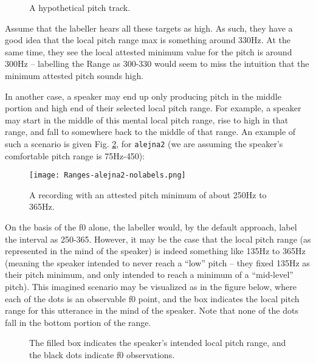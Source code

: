 \begin{figure}[H]
\centering
%

%
\caption{A hypothetical pitch track.%
\label{fig:ranges-what-if3 Ranges Adv}%
}
\end{figure}

Assume that the labeller hears all these targets as high. As such, they have a good idea that the local pitch range max is something around 330Hz. At the same time, they see the local attested minimum value for the pitch is around 300Hz – labelling the Range as 300-330 would seem to miss the intuition that the minimum attested pitch sounds high.

In another case, a speaker may end up only producing pitch in the middle portion and high end of their selected local pitch range. For example, a speaker may start in the middle of this mental local pitch range, rise to high in that range, and fall to somewhere back to the middle of that range. An example of such a scenario is given Fig. \ref{fig:alejna2-nolabels}, for \texttt{alejna2} (we are assuming the speaker’s comfortable pitch range is 75Hz-450):

\begin{figure}[H]
\centering
%
\texttt{[image: Ranges-alejna2-nolabels.png]}
%
\caption{A recording with an attested pitch minimum of about 250Hz to 365Hz.%
\label{fig:alejna2-nolabels}%
}
\end{figure}

On the basis of the f0 alone, the labeller would, by the default approach, label the interval as 250-365. However, it may be the case that the local pitch range (as represented in the mind of the speaker) is indeed something like 135Hz to 365Hz (meaning the speaker intended to never reach a “low” pitch – they fixed 135Hz as their pitch minimum, and only intended to reach a minimum of a “mid-level” pitch). This imagined scenario may be visualized as in the figure below, where each of the dots is an observable f0 point, and the box indicates the local pitch range for this utterance in the mind of the speaker. Note that none of the dots fall in the bottom portion of the range.

\begin{figure}[H]
\centering
%

%
\caption{The filled box indicates the speaker’s intended local pitch range, and the black dots indicate f0 observations.%
\label{fig:ranges intuition alejna2}%
}
\end{figure}

